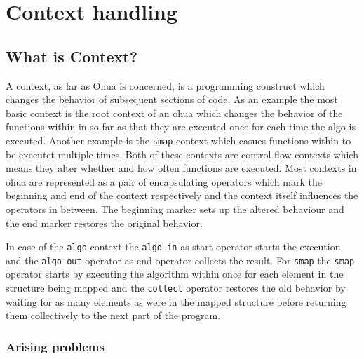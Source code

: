 
\chapter{Context handling} %

\label{ChapterContext} %


\section{What is Context?}

A context, as far as Ohua is concerned, is a programming construct which changes the behavior of subsequent sections of code.
As an example the most basic context is the root context of an ohua  which changes the behavior of the functions within in so far as that they are executed once for each time the algo is executed.
Another example is the \texttt{smap} context which casues functions within to be executet multiple times.
Both of these contexts are control flow contexts which means they alter whether and how often functions are executed.
Most contexts in ohua are represented as a pair of encapsulating operators which mark the beginning and end of the context respectively and the context itself influences the operators in between.
The beginning marker sets up the altered behaviour and the end marker restores the original behavior.

In case of the \texttt{algo} context the \texttt{algo-in} as start operator starts the execution and the \texttt{algo-out} operator as end operator collects the result.
For \texttt{smap} the \texttt{smap} operator starts by executing the algorithm within once for each element in the structure being mapped and the \texttt{collect} operator restores the old behavior by waiting for as many elements as were in the mapped structure before returning them collectively to the next part of the program.

\subsection{Arising problems}


